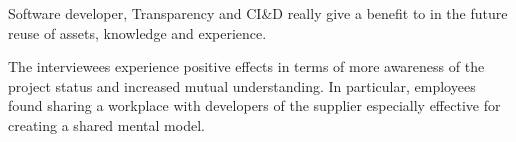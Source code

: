 \begin{aquote}{Software developer, \company{}}
Transparency and CI\&D really give a benefit to \company{} in the future reuse of assets, knowledge and experience.
\end{aquote}


The interviewees experience positive effects in terms of more awareness of the project status and increased mutual understanding. In particular, \company{} employees found sharing a workplace with developers of the supplier especially effective for creating a shared mental model.  %



%
% 
%
%
%

